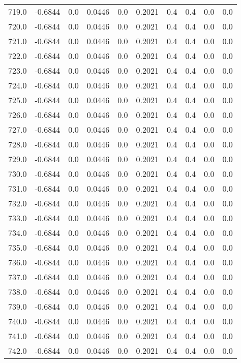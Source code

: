 \begin{longtable}{lrrrrrrrrr}
719.0 & -0.6844 & 0.0 & 0.0446 & 0.0 & 0.2021 & 0.4 & 0.4 & 0.0 & 0.0 \\
720.0 & -0.6844 & 0.0 & 0.0446 & 0.0 & 0.2021 & 0.4 & 0.4 & 0.0 & 0.0 \\
721.0 & -0.6844 & 0.0 & 0.0446 & 0.0 & 0.2021 & 0.4 & 0.4 & 0.0 & 0.0 \\
722.0 & -0.6844 & 0.0 & 0.0446 & 0.0 & 0.2021 & 0.4 & 0.4 & 0.0 & 0.0 \\
723.0 & -0.6844 & 0.0 & 0.0446 & 0.0 & 0.2021 & 0.4 & 0.4 & 0.0 & 0.0 \\
724.0 & -0.6844 & 0.0 & 0.0446 & 0.0 & 0.2021 & 0.4 & 0.4 & 0.0 & 0.0 \\
725.0 & -0.6844 & 0.0 & 0.0446 & 0.0 & 0.2021 & 0.4 & 0.4 & 0.0 & 0.0 \\
726.0 & -0.6844 & 0.0 & 0.0446 & 0.0 & 0.2021 & 0.4 & 0.4 & 0.0 & 0.0 \\
727.0 & -0.6844 & 0.0 & 0.0446 & 0.0 & 0.2021 & 0.4 & 0.4 & 0.0 & 0.0 \\
728.0 & -0.6844 & 0.0 & 0.0446 & 0.0 & 0.2021 & 0.4 & 0.4 & 0.0 & 0.0 \\
729.0 & -0.6844 & 0.0 & 0.0446 & 0.0 & 0.2021 & 0.4 & 0.4 & 0.0 & 0.0 \\
730.0 & -0.6844 & 0.0 & 0.0446 & 0.0 & 0.2021 & 0.4 & 0.4 & 0.0 & 0.0 \\
731.0 & -0.6844 & 0.0 & 0.0446 & 0.0 & 0.2021 & 0.4 & 0.4 & 0.0 & 0.0 \\
732.0 & -0.6844 & 0.0 & 0.0446 & 0.0 & 0.2021 & 0.4 & 0.4 & 0.0 & 0.0 \\
733.0 & -0.6844 & 0.0 & 0.0446 & 0.0 & 0.2021 & 0.4 & 0.4 & 0.0 & 0.0 \\
734.0 & -0.6844 & 0.0 & 0.0446 & 0.0 & 0.2021 & 0.4 & 0.4 & 0.0 & 0.0 \\
735.0 & -0.6844 & 0.0 & 0.0446 & 0.0 & 0.2021 & 0.4 & 0.4 & 0.0 & 0.0 \\
736.0 & -0.6844 & 0.0 & 0.0446 & 0.0 & 0.2021 & 0.4 & 0.4 & 0.0 & 0.0 \\
737.0 & -0.6844 & 0.0 & 0.0446 & 0.0 & 0.2021 & 0.4 & 0.4 & 0.0 & 0.0 \\
738.0 & -0.6844 & 0.0 & 0.0446 & 0.0 & 0.2021 & 0.4 & 0.4 & 0.0 & 0.0 \\
739.0 & -0.6844 & 0.0 & 0.0446 & 0.0 & 0.2021 & 0.4 & 0.4 & 0.0 & 0.0 \\
740.0 & -0.6844 & 0.0 & 0.0446 & 0.0 & 0.2021 & 0.4 & 0.4 & 0.0 & 0.0 \\
741.0 & -0.6844 & 0.0 & 0.0446 & 0.0 & 0.2021 & 0.4 & 0.4 & 0.0 & 0.0 \\
742.0 & -0.6844 & 0.0 & 0.0446 & 0.0 & 0.2021 & 0.4 & 0.4 & 0.0 & 0.0 \\

\end{longtable}
